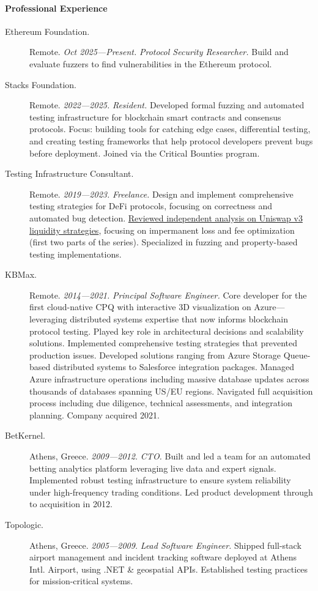 \documentclass[10pt]{article}
\newenvironment{myquote}
  {\list{}{\leftmargin=4.5mm\rightmargin=0cm}\item[]}
  {\endlist}
\begin{document}
\paragraph{Professional Experience}
\begin{myquote}
\begin{description}
\item[Ethereum Foundation.] Remote. \emph{Oct 2025—Present.} \emph{Protocol
  Security Researcher.}
  Build and evaluate fuzzers to find vulnerabilities in the Ethereum protocol.
\item[Stacks Foundation.] Remote. \emph{2022—2025.} \emph{Resident.}
  Developed formal fuzzing and automated testing infrastructure for blockchain
  smart contracts and consensus protocols. Focus: building tools for catching
  edge cases, differential testing, and creating testing frameworks that help
  protocol developers prevent bugs before deployment. Joined via the Critical
  Bounties program.
\item[Testing Infrastructure Consultant.] Remote. \emph{2019—2023.}
  \emph{Freelance.} Design and implement comprehensive testing strategies for
  DeFi protocols, focusing on correctness and automated bug detection.
  \href{https://atise.medium.com/64725c6c0b10}{Reviewed independent analysis
  on Uniswap v3 liquidity strategies}, focusing on impermanent loss and fee
  optimization (first two parts of the series). Specialized in fuzzing and
  property-based testing implementations.
\item[KBMax.] Remote. \emph{2014—2021.} \emph{Principal Software Engineer.}
  Core developer for the first cloud-native CPQ with interactive 3D
  visualization on Azure—leveraging distributed systems expertise that now
  informs blockchain protocol testing. Played key role in architectural
  decisions and scalability solutions. Implemented comprehensive testing
  strategies that prevented production issues. Developed solutions ranging from
  Azure Storage Queue-based distributed systems to Salesforce integration
  packages. Managed Azure infrastructure operations including massive database
  updates across thousands of databases spanning US/EU regions. Navigated full
  acquisition process including due diligence, technical assessments, and
  integration planning. Company acquired 2021.
\item[BetKernel.] Athens, Greece. \emph{2009—2012.} \emph{CTO.} Built and led
  a team for an automated betting analytics platform leveraging live data and
  expert signals. Implemented robust testing infrastructure to ensure system
  reliability under high-frequency trading conditions. Led product development
  through to acquisition in 2012.
\item[Topologic.] Athens, Greece. \emph{2005—2009.} \emph{Lead Software
  Engineer.} Shipped full-stack airport management and incident tracking
  software deployed at Athens Intl. Airport, using .NET \& geospatial APIs.
  Established testing practices for mission-critical systems.
\end{description}
\end{myquote}
\end{document}
